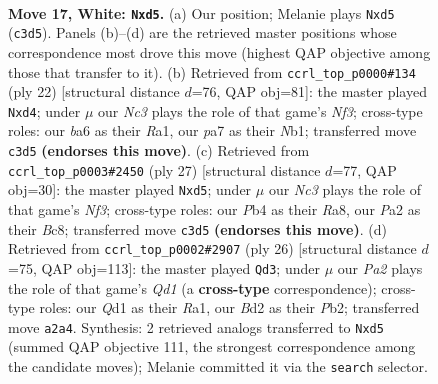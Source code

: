 \documentclass[11pt]{article}
\begin{document}
\clearpage

\begin{figure}[p]\centering
\begin{subfigure}{0.46\textwidth}\centering
\resizebox{\linewidth}{!}{%
\newchessgame
\chessboard[
  setfen={rn1qk1r1/p3bp2/b4np1/3p2N1/1Pp5/2N3P1/P2BPPB1/R2Q1RK1 w q - 1 17},
  showmover=false,
  pgfstyle=straightmove, color=movearrow, markmove={c3-d5}
]}
\caption{}
\end{subfigure}\hfill
\begin{subfigure}{0.46\textwidth}\centering
\resizebox{\linewidth}{!}{%
\newchessgame
\chessboard[
  setfen={r1bqk2r/pp2bppp/5n2/8/1nPp4/5NP1/P4PBP/RNBQ1RK1 w kq - 0 12},
  showmover=false,
  pgfstyle=straightmove, color=movearrow, markmove={f3-d4}
]}
\caption{}
\end{subfigure}
\\[4pt]
\begin{subfigure}{0.46\textwidth}\centering
\resizebox{\linewidth}{!}{%
\newchessgame
\chessboard[
  setfen={r1bq1rk1/4bppp/p1n2n2/1p1N4/8/PB3N2/1P3PPP/R1BQR1K1 b - - 0 14},
  showmover=false,
  pgfstyle=straightmove, color=movearrow, markmove={f6-d5}
]}
\caption{}
\end{subfigure}\hfill
\begin{subfigure}{0.46\textwidth}\centering
\resizebox{\linewidth}{!}{%
\newchessgame
\chessboard[
  setfen={r2qk2r/pp2bppp/2b2n2/3p2N1/3P4/P1N3P1/1P2P1BP/R2Q1RK1 w kq - 3 14},
  showmover=false,
  pgfstyle=straightmove, color=movearrow, markmove={d1-d3}
]}
\caption{}
\end{subfigure}
\caption{\textbf{Move 17, White: \texttt{Nxd5}.} (a) Our position; Melanie plays \texttt{Nxd5} (\texttt{c3d5}). Panels (b)--(d) are the retrieved master positions whose correspondence most drove this move (highest QAP objective among those that transfer to it). (b) Retrieved from \texttt{ccrl\_top\_p0000\#134} (ply 22) [structural distance $d$=76, QAP obj=81]: the master played \texttt{Nxd4}; under $\mu$ our \emph{Nc3} plays the role of that game's \emph{Nf3}; cross-type roles: our \emph{b}a6 as their \emph{R}a1, our \emph{p}a7 as their \emph{N}b1; transferred move \texttt{c3d5} \textbf{(endorses this move)}. (c) Retrieved from \texttt{ccrl\_top\_p0003\#2450} (ply 27) [structural distance $d$=77, QAP obj=30]: the master played \texttt{Nxd5}; under $\mu$ our \emph{Nc3} plays the role of that game's \emph{Nf3}; cross-type roles: our \emph{P}b4 as their \emph{R}a8, our \emph{P}a2 as their \emph{B}c8; transferred move \texttt{c3d5} \textbf{(endorses this move)}. (d) Retrieved from \texttt{ccrl\_top\_p0002\#2907} (ply 26) [structural distance $d$=75, QAP obj=113]: the master played \texttt{Qd3}; under $\mu$ our \emph{Pa2} plays the role of that game's \emph{Qd1} (a \textbf{cross-type} correspondence); cross-type roles: our \emph{Q}d1 as their \emph{R}a1, our \emph{B}d2 as their \emph{P}b2; transferred move \texttt{a2a4}. Synthesis: 2 retrieved analogs transferred to \texttt{Nxd5} (summed QAP objective 111, the strongest correspondence among the candidate moves); Melanie committed it via the \texttt{search} selector.}
\label{fig:thought-m32}
\end{figure}
\end{document}
